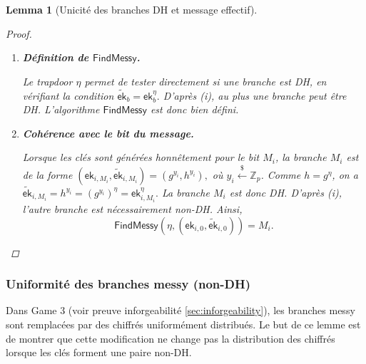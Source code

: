 \documentclass[10pt,a4paper]{article}
\theoremstyle{definition}
\theoremstyle{plain}
\newtheorem{lemma}[definition]{Lemma}
\theoremstyle{remark}
\newcommand{\sample}{\xleftarrow{\$}}
\begin{document}
\begin{lemma}[Unicité des branches DH et message effectif]
\begin{proof}
\begin{enumerate}
    \medskip

    \item[\textnormal{(ii)}] \textbf{Définition de $\mathsf{FindMessy}$.}

    Le trapdoor $\eta$ permet de tester directement si une branche est DH,
    en vérifiant la condition
    $
    \widetilde{\mathsf{ek}}_b
    =
    \mathsf{ek}_b^\eta.
    $
    D'après (i), au plus une branche peut être DH. L'algorithme
    $\mathsf{FindMessy}$ est donc bien défini.

    \medskip

    \item[\textnormal{(iii)}] \textbf{Cohérence avec le bit du message.}

    Lorsque les clés sont générées honnêtement pour le bit $M_i$, la branche
    $M_i$ est de la forme
    $
    (\mathsf{ek}_{i,M_i},\widetilde{\mathsf{ek}}_{i,M_i})
    =
    (g^{y_i},h^{y_i}),
    $
    où $y_i\sample\mathbb{Z}_p$. Comme $h=g^\eta$, on a
    $
    \widetilde{\mathsf{ek}}_{i,M_i}
    =
    h^{y_i}
    =
    (g^{y_i})^\eta
    =
    \mathsf{ek}_{i,M_i}^\eta.
    $
    La branche $M_i$ est donc DH. D'après (i), l'autre branche est
    nécessairement non-DH. Ainsi,
    \[
    \mathsf{FindMessy}
    \left(
    \eta,
    (\mathsf{ek}_{i,0},\widetilde{\mathsf{ek}}_{i,0})
    \right)
    =
    M_i.
    \]

\end{enumerate}

\end{proof}

\end{lemma}

\subsubsection{Uniformité des branches messy (non-DH)}

Dans Game 3 (voir preuve inforgeabilité \ref{sec:inforgeability}), les branches messy sont remplacées par des chiffrés
uniformément distribués. Le but de ce lemme est de montrer que cette
modification ne change pas la distribution des chiffrés lorsque les
clés forment une paire non-DH.
\end{document}
